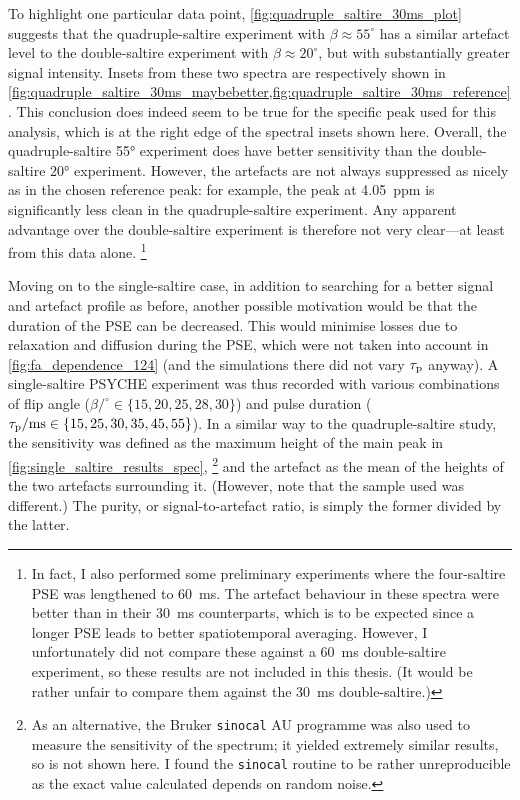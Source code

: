 To highlight one particular data point, \cref{fig:quadruple_saltire_30ms_plot} suggests that the quadruple-saltire experiment with $\beta \approx 55^\circ$ has a similar artefact level to the double-saltire experiment with $\beta \approx 20^\circ$, but with substantially greater signal intensity.
Insets from these two spectra are respectively shown in \cref{fig:quadruple_saltire_30ms_maybebetter,fig:quadruple_saltire_30ms_reference}.
This conclusion does indeed seem to be true for the specific peak used for this analysis, which is at the right edge of the spectral insets shown here.
Overall, the quadruple-saltire \ang{55} experiment does have better sensitivity than the double-saltire \ang{20} experiment.
However, the artefacts are not always suppressed as nicely as in the chosen reference peak: for example, the peak at \qty{4.05}{ppm} is significantly less clean in the quadruple-saltire experiment.
Any apparent advantage over the double-saltire experiment is therefore not very clear---at least from this data alone.%
\footnote{In fact, I also performed some preliminary experiments where the four-saltire PSE was lengthened to \qty{60}{\ms}. The artefact behaviour in these spectra were better than in their \qty{30}{\ms} counterparts, which is to be expected since a longer PSE leads to better spatiotemporal averaging. However, I unfortunately did not compare these against a \qty{60}{\ms} double-saltire experiment, so these results are not included in this thesis. (It would be rather unfair to compare them against the \qty{30}{\ms} double-saltire.)}

Moving on to the single-saltire case, in addition to searching for a better signal and artefact profile as before, another possible motivation would be that the duration of the PSE can be decreased.
This would minimise losses due to relaxation and diffusion during the PSE, which were not taken into account in \cref{fig:fa_dependence_124} (and the simulations there did not vary $\tau_\mathrm{p}$ anyway).
A single-saltire PSYCHE experiment was thus recorded with various combinations of flip angle ($\beta/^\circ \in \{15, 20, 25, 28, 30\}$) and pulse duration ($\tau_\mathrm{p}/\text{ms} \in \{15, 25, 30, 35, 45, 55\}$).
In a similar way to the quadruple-saltire study, the sensitivity was defined as the maximum height of the main peak in \cref{fig:single_saltire_results_spec},%
\footnote{As an alternative, the Bruker \texttt{sinocal} AU programme was also used to measure the sensitivity of the spectrum; it yielded extremely similar results, so is not shown here. I found the \texttt{sinocal} routine to be rather unreproducible as the exact value calculated depends on random noise.}
and the artefact as the mean of the heights of the two artefacts surrounding it.
(However, note that the sample used was different.)
The purity, or signal-to-artefact ratio, is simply the former divided by the latter.

